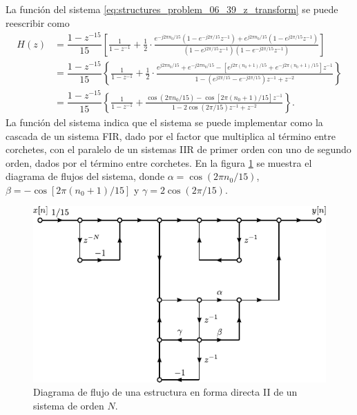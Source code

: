 \documentclass[a4paper]{report}
\begin{document}
La función del sistema \ref{eq:structures_problem_06_39_z_transform} se puede reescribir como
\begin{align*}
 H(z)&=\dfrac{1-z^{-15}}{15}\left[\frac{1}{1-z^{-1}}
   +\frac{1}{2}\cdot\frac{e^{-j2\pi n_0/15}(1-e^{-j2\pi/15}z^{-1})+e^{j2\pi n_0/15}(1-e^{j2\pi/15}z^{-1})}{(1-e^{j2\pi/15}z^{-1})(1-e^{-j2\pi/15}z^{-1})}\right]\\
     &=\dfrac{1-z^{-15}}{15}\left\{\frac{1}{1-z^{-1}}
   +\frac{1}{2}\cdot\frac{e^{j2\pi n_0/15}+e^{-j2\pi n_0/15}-\left[e^{j2\pi(n_0+1)/15}+e^{-j2\pi(n_0+1)/15}\right]z^{-1}}{1-\left(e^{j2\pi/15}-e^{-j2\pi/15}\right)z^{-1}+z^{-2}}\right\}\\
     &=\dfrac{1-z^{-15}}{15}\left\{\frac{1}{1-z^{-1}}
   +\frac{\cos(2\pi n_0/15)-\cos\left[2\pi(n_0+1)/15\right]z^{-1}}{1-2\cos(2\pi/15)z^{-1}+z^{-2}}\right\}.
\end{align*}
La función del sistema indica que el sistema se puede implementar como la cascada de un sistema FIR, dado por el factor que multiplica al término entre corchetes, con el paralelo de un sistemas IIR de primer orden con uno de segundo orden, dados por el término entre corchetes. En la figura \ref{fig:structures_problem_06_39_flow_graph} se muestra el diagrama de flujos del sistema, donde \(\alpha=\cos(2\pi n_0/15)\), \(\beta=-\cos\left[2\pi(n_0+1)/15\right]\) y \(\gamma=2\cos(2\pi/15)\).
\begin{figure}[!htb]
 \begin{minipage}[c]{0.72\textwidth}
  \includegraphics[width=\textwidth]{figuras/structures_problem_06_39_flow_graph.pdf}
 \end{minipage}\hfill
 \begin{minipage}[c]{0.18\textwidth}
  \caption{
   Diagrama de flujo de una estructura en forma directa II de un sistema de orden \(N\).
   }\label{fig:structures_problem_06_39_flow_graph}
 \end{minipage}
\end{figure}  
\end{document}
